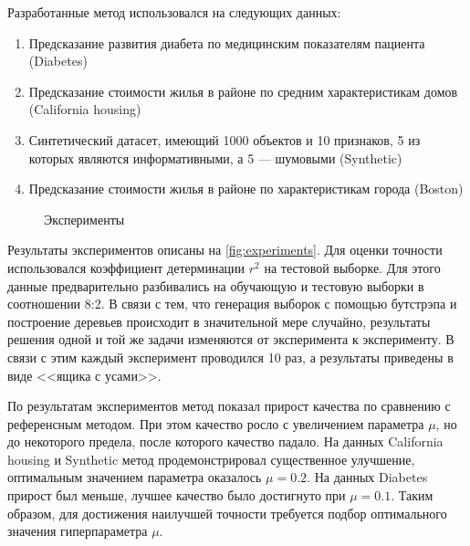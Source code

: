 \documentclass{article}
\begin{document}
Разработанные метод использовался на следующих данных:
\begin{enumerate}
  \item Предсказание развития диабета по медицинским показателям пациента (Diabetes)
  \item Предсказание стоимости жилья в районе по средним характеристикам домов (California housing)
  \item Синтетический датасет, имеющий 1000 объектов и 10 признаков, 5 из которых являются информативными, а 5 --- шумовыми (Synthetic)
  \item Предсказание стоимости жилья в районе по характеристикам города (Boston)
\end{enumerate}

\begin{figure}[h]
  \centering
  
  
  
  
  \caption{Эксперименты}
  \label{fig:experiments}
\end{figure}

Результаты экспериментов описаны на \autoref{fig:experiments}. Для оценки точности использовался коэффициент детерминации $r^2$ на тестовой выборке. Для этого данные предварительно разбивались на обучающую и тестовую выборки в соотношении 8:2. В связи с тем, что генерация выборок с помощью бутстрэпа и построение деревьев происходит в значительной мере случайно, результаты решения одной и той же задачи изменяются от эксперимента к эксперименту. В связи с этим каждый эксперимент проводился 10 раз, а результаты приведены в виде <<ящика с усами>>.

По результатам экспериментов метод показал прирост качества по сравнению с референсным методом. При этом качество росло с увеличением параметра $\mu$, но до некоторого предела, после которого качество падало. На данных California housing и Synthetic метод продемонстрировал существенное улучшение, оптимальным значением параметра оказалось $\mu=0.2$. На данных Diabetes прирост был меньше, лучшее качество было достигнуто при $\mu=0.1$. Таким образом, для достижения наилучшей точности требуется подбор оптимального значения гиперпараметра $\mu$. 

\end{document}
